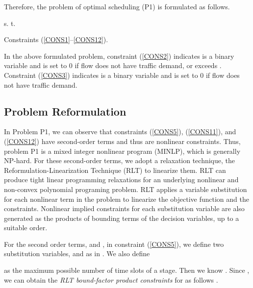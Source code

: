 \documentclass[journal]{IEEEtran}
\begin{document}
Therefore, the problem of optimal scheduling (P1) is formulated as follows.


\hspace{0.45cm}s. t.






\hspace{0.7cm}Constraints (\ref{CONS1}--\ref{CONS12}).

\vbox{}

In the above formulated problem, constraint (\ref{CONS2}) indicates  is a binary variable
and is set to 0 if flow  does not have traffic demand, or  exceeds . Constraint
(\ref{CONS3}) indicates  is a binary variable and is set to 0 if flow  does not have
traffic demand.
























\subsection{Problem Reformulation}\label{S4-2}

In Problem P1, we can observe that constraints (\ref{CONS5}), (\ref{CONS11}), and (\ref{CONS12})
have second-order terms and thus are nonlinear constraints. Thus, problem P1 is a mixed integer
nonlinear program (MINLP), which is generally NP-hard. For these second-order terms, we adopt a
relaxation technique, the Reformulation-Linearization Technique (RLT) \cite{RLT, mao_20} to
linearize them. RLT can produce tight linear programming relaxations for an underlying nonlinear
and non-convex polynomial programing problem. RLT applies a variable substitution for each
nonlinear term in the problem to linearize the objective function and the constraints. Nonlinear
implied constraints for each substitution variable are also generated as the products of bounding
terms of the decision variables, up to a suitable order.

For the second order terms,  and , in constraint
(\ref{CONS5}), we define two substitution variables,  and
 as in \cite{mao}. We also define

as the maximum possible number of time slots of a stage. Then we know . Since , we can obtain the \emph{RLT bound-factor product
constraints} for  as follows \cite{mao}.
\end{document}
